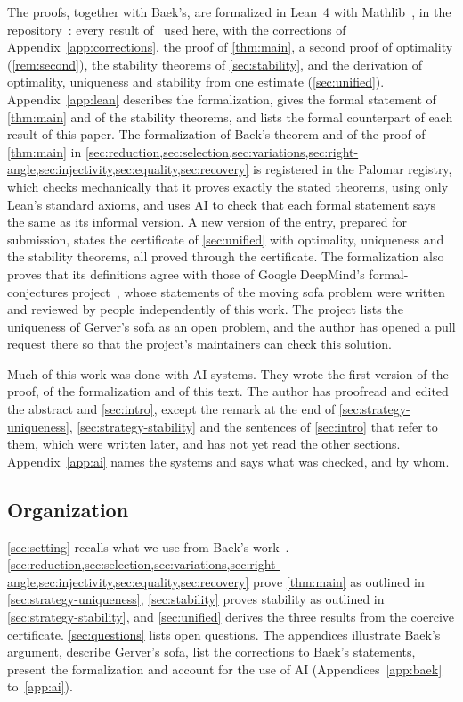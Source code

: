 The proofs, together with Baek's, are formalized in Lean~4 with
Mathlib~\cite{Lean4,Mathlib20}, in the repository~\cite{Companion}: every result
of~\cite{Baek} used here, with the corrections of
Appendix~\ref{app:corrections}, the proof of \cref{thm:main}, a second proof of
optimality (\cref{rem:second}), the stability theorems of \cref{sec:stability},
and the derivation of optimality, uniqueness and stability from one estimate
(\cref{sec:unified}). Appendix~\ref{app:lean} describes the formalization, gives
the formal statement of \cref{thm:main} and of the stability theorems, and lists
the formal counterpart of each result of this paper. The formalization of
Baek's theorem and of the proof of \cref{thm:main} in
\cref{sec:reduction,sec:selection,sec:variations,sec:right-angle,sec:injectivity,sec:equality,sec:recovery}
is registered in the Palomar registry, which checks mechanically that it proves
exactly the stated theorems, using only Lean's standard axioms, and uses AI to
check that each formal statement says the same as its informal version. A new
version of the entry, prepared for submission, states the certificate of
\cref{sec:unified} with optimality, uniqueness and the stability theorems, all
proved through the certificate. The
formalization also proves that its definitions
agree with those of Google DeepMind's formal-conjectures
project~\cite{FormalConjectures}, whose statements of the moving sofa problem
were written and reviewed by people independently of this work. The project
lists the uniqueness of Gerver's sofa as an open problem, and the author has
opened a pull request there so that the project's maintainers can check this
solution.

Much of this work was done with AI systems. They wrote the first version of the
proof, of the formalization and of this text. The author has proofread and
edited the abstract and \cref{sec:intro}, except the remark at the end of
\cref{sec:strategy-uniqueness}, \cref{sec:strategy-stability} and the
sentences of \cref{sec:intro} that refer to them, which were written later, and
has not yet read the other sections. Appendix~\ref{app:ai} names the systems and says what was checked, and by whom.

\subsection{Organization}

\cref{sec:setting} recalls what we use from Baek's work~\cite{Baek}.
\cref{sec:reduction,sec:selection,sec:variations,sec:right-angle,sec:injectivity,sec:equality,sec:recovery}
prove \cref{thm:main} as outlined in \cref{sec:strategy-uniqueness},
\cref{sec:stability} proves stability as outlined in
\cref{sec:strategy-stability}, and \cref{sec:unified} derives the three results
from the coercive certificate. \cref{sec:questions} lists open questions. The
appendices illustrate Baek's argument, describe Gerver's sofa, list the
corrections to Baek's statements, present the formalization and account for the
use of AI (Appendices~\ref{app:baek} to~\ref{app:ai}).
